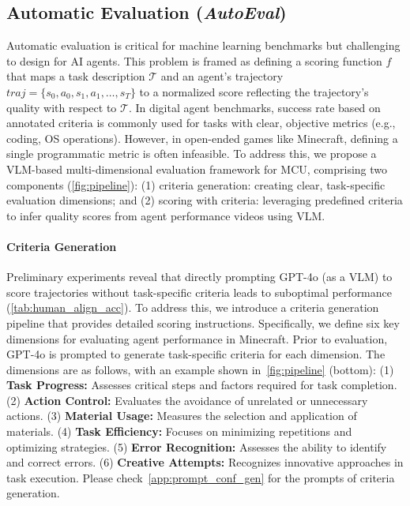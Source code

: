 



\subsection{Automatic Evaluation (\emph{AutoEval})}
\label{sec:auto_eval}

Automatic evaluation is critical for machine learning benchmarks but challenging to design for AI agents. This problem is framed as defining a scoring function $f$ that maps a task description $\mathcal{T}$ and an agent’s trajectory $\textit{traj} = \{s_0, a_0, s_1, a_1, \ldots, s_T\}$ to a normalized score reflecting the trajectory's quality with respect to $\mathcal{T}$. In digital agent benchmarks, success rate based on annotated criteria is commonly used for tasks with clear, objective metrics (e.g., coding, OS operations). However, in open-ended games like Minecraft, defining a single programmatic metric is often infeasible. To address this, we propose a VLM-based multi-dimensional evaluation framework for MCU, comprising two components (\cref{fig:pipeline}): (1) criteria generation: creating clear, task-specific evaluation dimensions; and (2) scoring with criteria: leveraging predefined criteria to infer quality scores from agent performance videos using VLM.



\paragraph{Criteria Generation}
Preliminary experiments reveal that directly prompting GPT-4o (as a VLM) to score trajectories without task-specific criteria leads to suboptimal performance (\cref{tab:human_align_acc}). To address this, we introduce a criteria generation pipeline that provides detailed scoring instructions. Specifically, we define six key dimensions for evaluating agent performance in Minecraft. Prior to evaluation, GPT-4o is prompted to generate task-specific criteria for each dimension. The dimensions are as follows, with an example shown in~\cref{fig:pipeline} (bottom): (1) \textbf{Task Progress:} Assesses critical steps and factors required for task completion. (2) \textbf{Action Control:} Evaluates the avoidance of unrelated or unnecessary actions. (3) \textbf{Material Usage:} Measures the selection and application of materials. (4) \textbf{Task Efficiency:} Focuses on minimizing repetitions and optimizing strategies. (5) \textbf{Error Recognition:} Assesses the ability to identify and correct errors. (6) \textbf{Creative Attempts:} Recognizes innovative approaches in task execution. Please check~\cref{app:prompt_conf_gen} for the prompts of criteria generation.



